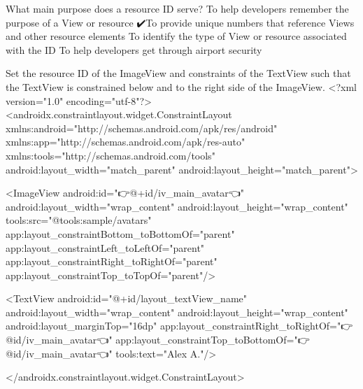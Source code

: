         What main purpose does a resource ID serve?
            To help developers remember the purpose of a View or resource
            ✔️To provide unique numbers that reference Views and other resource elements
            To identify the type of View or resource associated with the ID
            To help developers get through airport security

        Set the resource ID of the ImageView and constraints of the TextView such that the TextView is constrained below and to the right side of the ImageView.
            <?xml version="1.0" encoding="utf-8"?>
            <androidx.constraintlayout.widget.ConstraintLayout
                xmlns:android="http://schemas.android.com/apk/res/android"
                xmlns:app="http://schemas.android.com/apk/res-auto"
                xmlns:tools="http://schemas.android.com/tools"
                android:layout_width="match_parent"
                android:layout_height="match_parent">
            
                <ImageView
                    android:id="👉@+id/iv_main_avatar👈"
                    android:layout_width="wrap_content"
                    android:layout_height="wrap_content"
                    tools:src="@tools:sample/avatars"
                    app:layout_constraintBottom_toBottomOf="parent"
                    app:layout_constraintLeft_toLeftOf="parent"
                    app:layout_constraintRight_toRightOf="parent"
                    app:layout_constraintTop_toTopOf="parent"/>
            
                <TextView
                    android:id="@+id/layout_textView_name"
                    android:layout_width="wrap_content"
                    android:layout_height="wrap_content"
                    android:layout_marginTop="16dp"
                    app:layout_constraintRight_toRightOf="👉@id/iv_main_avatar👈"
                    app:layout_constraintTop_toBottomOf="👉@id/iv_main_avatar👈"
                    tools:text="Alex A."/>
            
            </androidx.constraintlayout.widget.ConstraintLayout>